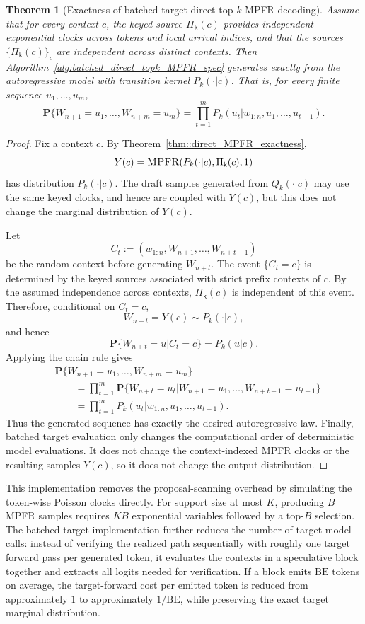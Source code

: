 \documentclass{article}
\theoremstyle{plain}
\newtheorem{theorem}{Theorem}[section]
\theoremstyle{definition}
\begin{document}
\begin{theorem}[Exactness of batched-target direct-top-$k$ MPFR decoding]
\label{thm::batched_direct_topk_MPFR_spec_exactness}
Assume that for every context $c$, the keyed source $\Pi_{\mathsf{k}}(c)$ provides independent exponential clocks across tokens and local arrival indices, and that the sources $\{\Pi_{\mathsf{k}}(c)\}_c$ are independent across distinct contexts. 
Then Algorithm~\ref{alg:batched_direct_topk_MPFR_spec} generates exactly from the autoregressive model with transition kernel $P_k(\cdot|c)$. 
That is, for every finite sequence $u_1,\ldots,u_m$,
\[
\mathbf P\{W_{n+1}=u_1,\ldots,W_{n+m}=u_m\}
=
\prod_{t=1}^{m}
P_k(u_t|w_{1:n},u_1,\ldots,u_{t-1}).
\]
\end{theorem}

\begin{proof}
Fix a context $c$. 
By Theorem~\ref{thm::direct_MPFR_exactness},
\[
Y(c)=\textsc{MPFR}(P_k(\cdot|c),\Pi_{\mathsf{k}}(c),1)
\]
has distribution $P_k(\cdot|c)$. 
The draft samples generated from $Q_k(\cdot|c)$ may use the same keyed clocks, and hence are coupled with $Y(c)$, but this does not change the marginal distribution of $Y(c)$.

Let
\[
C_t:=(w_{1:n},W_{n+1},\ldots,W_{n+t-1})
\]
be the random context before generating $W_{n+t}$. 
The event $\{C_t=c\}$ is determined by the keyed sources associated with strict prefix contexts of $c$. 
By the assumed independence across contexts, $\Pi_{\mathsf{k}}(c)$ is independent of this event. 
Therefore, conditional on $C_t=c$,
\[
W_{n+t}=Y(c)\sim P_k(\cdot|c),
\]
and hence
\[
\mathbf P\{W_{n+t}=u|C_t=c\}=P_k(u|c).
\]
Applying the chain rule gives
\[
\begin{aligned}
&\mathbf P\{W_{n+1}=u_1,\ldots,W_{n+m}=u_m\} \\
&\qquad =
\prod_{t=1}^{m}
\mathbf P\{W_{n+t}=u_t
| W_{n+1}=u_1,\ldots,W_{n+t-1}=u_{t-1}\} \\
&\qquad =
\prod_{t=1}^{m}
P_k(u_t|w_{1:n},u_1,\ldots,u_{t-1}).
\end{aligned}
\]
Thus the generated sequence has exactly the desired autoregressive law. 
Finally, batched target evaluation only changes the computational order of deterministic model evaluations. 
It does not change the context-indexed MPFR clocks or the resulting samples $Y(c)$, so it does not change the output distribution.
\end{proof}


This implementation removes the proposal-scanning overhead by simulating the token-wise Poisson clocks directly. 
For support size at most $K$, producing $B$ MPFR samples requires $KB$ exponential variables followed by a top-$B$ selection. 
The batched target implementation further reduces the number of target-model calls: instead of verifying the realized path sequentially with roughly one target forward pass per generated token, it evaluates the contexts in a speculative block together and extracts all logits needed for verification. 
If a block emits $\mathrm{BE}$ tokens on average, the target-forward cost per emitted token is reduced from approximately $1$ to approximately $1/\mathrm{BE}$, while preserving the exact target marginal distribution.
\end{document}
